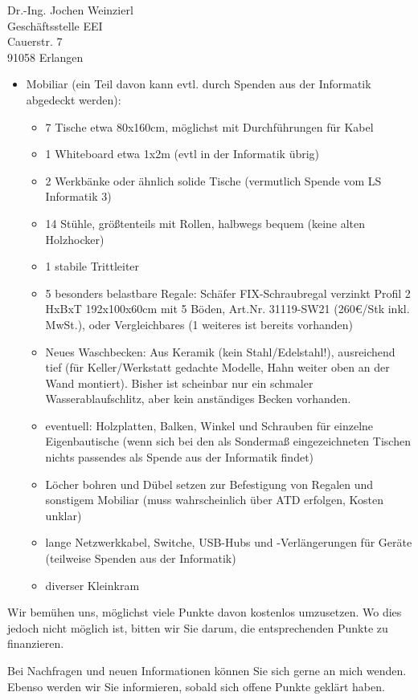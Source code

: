 \documentclass[a4paper,german]{letter}
\begin{document}
\begin{letter}{Dr.-Ing. Jochen Weinzierl\\ Geschäftsstelle EEI\\ Cauerstr. 7\\ 91058 Erlangen}
\begin{itemize}
\item Mobiliar (ein Teil davon kann evtl. durch Spenden aus der Informatik abgedeckt werden):
	\begin{itemize}
	\item 7 Tische etwa 80x160cm, möglichst mit Durchführungen für Kabel
	\item 1 Whiteboard etwa 1x2m (evtl in der Informatik übrig)
	\item 2 Werkbänke oder ähnlich solide Tische (vermutlich Spende vom LS Informatik 3)
	\item 14 Stühle, größtenteils mit Rollen, halbwegs bequem (keine alten Holzhocker)
	\item 1 stabile Trittleiter
	\item 5 besonders belastbare Regale: Schäfer FIX-Schraubregal verzinkt Profil 2 \\
		HxBxT 192x100x60cm mit 5 Böden, Art.Nr. 31119-SW21 (260€/Stk inkl. MwSt.), oder Vergleichbares (1 weiteres ist bereits vorhanden)
	\item Neues Waschbecken: Aus Keramik (kein Stahl/Edelstahl!), ausreichend tief (für Keller/Werkstatt gedachte Modelle, Hahn weiter oben an der Wand montiert). Bisher ist scheinbar nur ein schmaler Wasserablaufschlitz, aber kein anständiges Becken vorhanden.
	\item eventuell: Holzplatten, Balken, Winkel und Schrauben für einzelne Eigenbautische (wenn sich bei den als Sondermaß eingezeichneten Tischen nichts passendes als Spende aus der Informatik findet)
	\item Löcher bohren und Dübel setzen zur Befestigung von Regalen und sonstigem Mobiliar (muss wahrscheinlich über ATD erfolgen, Kosten unklar)
	\item lange Netzwerkkabel, Switche, USB-Hubs und -Verlängerungen für Geräte (teilweise Spenden aus der Informatik)
	\item diverser Kleinkram
	\end{itemize}
\end{itemize}

Wir bemühen uns, möglichst viele Punkte davon kostenlos umzusetzen. Wo dies jedoch nicht möglich ist, bitten wir Sie darum, die entsprechenden Punkte zu finanzieren.

Bei Nachfragen und neuen Informationen können Sie sich gerne an mich wenden. Ebenso werden wir Sie informieren, sobald sich offene Punkte geklärt haben.



\end{letter}
\end{document}
